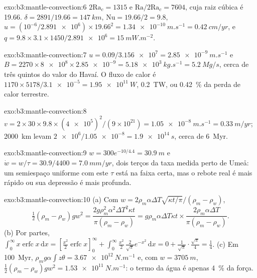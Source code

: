 \begin{solution}{exo:b3:mantle-convection:6}
$2\mathrm{Ra}_c = 1315$ e $\mathrm{Ra}/2\mathrm{Ra}_c = 7604$, cuja raiz cúbica
é 19.66. $\delta = 2891/19.66 = \qty{147}{km}$, $\mathrm{Nu} = 19.66/2 =
9.8$, $u = (10^{-6}/\num{2.891e6})\times19.66^2 = \qty{1.34e-10}{m.s^{-1}} =
\qty{0.42}{cm/yr}$, e $q = 9.8\times3.1\times1450/\num{2.891e6} =
\qty{15}{mW.m^{-2}}$.
\end{solution}

\begin{solution}{exo:b3:mantle-convection:7}
$u = 0.09/\num{3.156e7} = \qty{2.85e-9}{m.s^{-1}}$ e $B = 2270\times\num{8e8}
\times\num{2.85e-9} = \qty{5.18e3}{kg.s^{-1}} = \qty{5.2}{Mg/s}$, cerca de
três quintos do valor do Havaí. O fluxo de calor é $1170\times5178/\num{3.1e-5} =
\qty{1.95e11}{W}$, \qty{0.2}{TW}, ou \qty{0.42}{\percent} da perda de
calor terrestre.
\end{solution}

\begin{solution}{exo:b3:mantle-convection:8}
$v = 2\times30\times9.8\times(\num{4e5})^2/(9\times10^{21}) =
\qty{1.05e-8}{m.s^{-1}} = \qty{0.33}{m/yr}$; \qty{2000}{km} levam
$\num{2e6}/\num{1.05e-8} = \qty{1.9e14}{s}$, cerca de \qty{6}{Myr}.
\end{solution}

\begin{solution}{exo:b3:mantle-convection:9}
$w = 300e^{-10/4.4} = \qty{30.9}{m}$ e $\dot w = w/\tau = 30.9/4400 =
\qty{7.0}{mm/yr}$, dois terços da taxa medida perto de Umeå: um
semiespaço uniforme com este $\tau$ está na faixa certa, mas o rebote real é
mais rápido ou sua depressão é mais profunda.
\end{solution}

\begin{solution}{exo:b3:mantle-convection:10}
(a) Com $w = 2\rho_m\alpha\Delta T\sqrt{\kappa t/\pi}/(\rho_m - \rho_w)$,
\[
  \tfrac12(\rho_m - \rho_w)gw^2 = \frac{2g\rho_m^2\alpha^2\Delta T^2\kappa t}
  {\pi(\rho_m - \rho_w)} = g\rho_m\alpha\Delta T\kappa t\times
  \frac{2\rho_m\alpha\Delta T}{\pi(\rho_m - \rho_w)} .
\] (b) Por partes,
$\int_0^\infty x\operatorname{erfc}x\,\mathrm dx = [\tfrac{x^2}2\operatorname{erfc}
x]_0^\infty + \int_0^\infty\tfrac{x^2}2\,\tfrac2{\sqrt\pi}e^{-x^2}\,\mathrm dx =
0 + \tfrac1{\sqrt\pi}\cdot\tfrac{\sqrt\pi}4 = \tfrac14$. (c) Em \qty{100}{Myr},
$\rho_mg\alpha\int z\theta = \qty{3.67e12}{N.m^{-1}}$ e, com $w =
\qty{3705}{m}$, $\tfrac12(\rho_m - \rho_w)gw^2 = \qty{1.53e11}{N.m^{-1}}$: o
termo da água é apenas \qty{4}{\percent} da força.
\end{solution}

